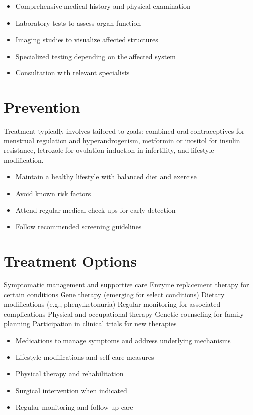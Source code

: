 \begin{itemize}[noitemsep]
  \item Comprehensive medical history and physical examination
  \item Laboratory tests to assess organ function
  \item Imaging studies to visualize affected structures
  \item Specialized testing depending on the affected system
  \item Consultation with relevant specialists
\end{itemize}
\section{Prevention}
Treatment typically involves tailored to goals: combined oral contraceptives for menstrual regulation and hyperandrogenism, metformin or inositol for insulin resistance, letrozole for ovulation induction in infertility, and lifestyle modification.

\begin{itemize}[noitemsep]
  \item Maintain a healthy lifestyle with balanced diet and exercise
  \item Avoid known risk factors
  \item Attend regular medical check-ups for early detection
  \item Follow recommended screening guidelines
\end{itemize}
\section{Treatment Options}
Symptomatic management and supportive care Enzyme replacement therapy for certain conditions Gene therapy (emerging for select conditions) Dietary modifications (e.g., phenylketonuria) Regular monitoring for associated complications Physical and occupational therapy Genetic counseling for family planning Participation in clinical trials for new therapies

\begin{itemize}[noitemsep]
  \item Medications to manage symptoms and address underlying mechanisms
  \item Lifestyle modifications and self-care measures
  \item Physical therapy and rehabilitation
  \item Surgical intervention when indicated
  \item Regular monitoring and follow-up care
\end{itemize}
